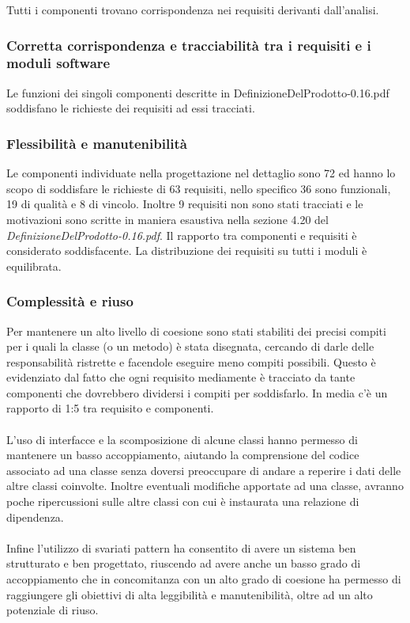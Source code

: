 Tutti i componenti trovano corrispondenza nei requisiti derivanti dall'analisi.

\subsubsection*{Corretta corrispondenza e tracciabilit\`a tra i requisiti e i
moduli software} 
Le funzioni dei singoli componenti descritte in DefinizioneDelProdotto-0.16.pdf
soddisfano le richieste dei requisiti ad essi tracciati.

\subsubsection*{Flessibilit\`a e manutenibilit\`a}
Le componenti individuate nella progettazione nel dettaglio sono 72 ed
hanno lo scopo di soddisfare le richieste di 63 requisiti, nello specifico 36
sono funzionali, 19 di qualit\`a e 8 di vincolo. Inoltre 9 requisiti non sono
stati tracciati e le motivazioni sono scritte in maniera esaustiva nella sezione
4.20 del \emph{DefinizioneDelProdotto-0.16.pdf}. Il rapporto tra componenti e
requisiti \`e considerato soddisfacente. La distribuzione dei
requisiti su tutti i moduli \`e equilibrata.

\subsubsection*{Complessit\`a e riuso}
Per mantenere un alto livello di coesione sono stati stabiliti dei precisi
compiti per i quali la classe (o un metodo) \`e stata disegnata, cercando di
darle delle responsabilit\`a ristrette e facendole eseguire meno compiti
possibili. Questo \`e evidenziato dal fatto che ogni requisito mediamente \`e
tracciato da tante componenti che dovrebbero dividersi i compiti per
soddisfarlo. In media c'\`e un rapporto di 1:5 tra requisito e componenti. \\\\
L'uso di interfacce e la scomposizione di alcune classi hanno permesso di
mantenere un basso accoppiamento, aiutando la comprensione del codice associato
ad una classe senza doversi preoccupare di andare a reperire i dati delle altre
classi coinvolte. Inoltre eventuali modifiche apportate ad una classe, avranno
poche ripercussioni sulle altre classi con cui \`e instaurata una relazione di
dipendenza. \\\\
Infine l'utilizzo di svariati pattern ha consentito di avere un sistema ben
strutturato e ben progettato, riuscendo ad avere anche un basso grado di
accoppiamento che in concomitanza con un alto grado di coesione ha permesso di
raggiungere gli obiettivi di alta leggibilit\`a e manutenibilit\`a, oltre ad un
alto potenziale di riuso.


